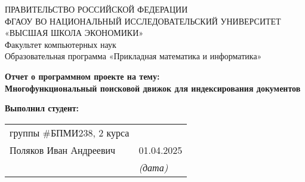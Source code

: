\begin{titlepage}
    \newpage
    
    {
    \begin{center}
    ПРАВИТЕЛЬСТВО РОССИЙСКОЙ ФЕДЕРАЦИИ\\
    ФГАОУ ВО НАЦИОНАЛЬНЫЙ ИССЛЕДОВАТЕЛЬСКИЙ УНИВЕРСИТЕТ\\
    «ВЫСШАЯ ШКОЛА ЭКОНОМИКИ»
    \\
    \bigskip
    Факультет компьютерных наук\\
    Образовательная программа «Прикладная математика и информатика»
    \end{center}
    }
    
    \vspace{2em}
    \vspace{4em}
    
    \begin{center}
    {\bf Отчет о программном проекте на тему:}\\
    {\bf Многофункциональный поисковой движок для индексирования
    документов}\\
    \end{center}
    
    \vspace{2em}
    
    {\bf Выполнил студент:\vspace{2mm}}
    
    {
    \begin{tabular}{l@{\hskip 1.5cm}l}
    группы \#БПМИ238, 2 курса 
    \\ Поляков Иван Андреевич & 01.04.2025 \\ & \hspace{2mm} \textit{\footnotesize (дата)} \\
    \end{tabular}}
    
    

\end{titlepage}
